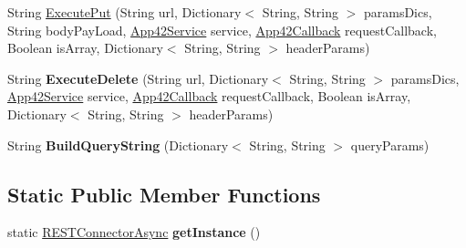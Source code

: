 \begin{DoxyCompactItemize}
\item 
String \hyperlink{classcom_1_1shephertz_1_1app42_1_1paas_1_1sdk_1_1windows_1_1connection_1_1_r_e_s_t_connector_async_a3ba6b0d5a9414e8f6b067ed7ba6167a6}{Execute\+Put} (String url, Dictionary$<$ String, String $>$ params\+Dics, String body\+Pay\+Load, \hyperlink{classcom_1_1shephertz_1_1app42_1_1paas_1_1sdk_1_1windows_1_1_app42_service}{App42\+Service} service, \hyperlink{interfacecom_1_1shephertz_1_1app42_1_1paas_1_1sdk_1_1windows_1_1_app42_callback}{App42\+Callback} request\+Callback, Boolean is\+Array, Dictionary$<$ String, String $>$ header\+Params)
\item 
\hypertarget{classcom_1_1shephertz_1_1app42_1_1paas_1_1sdk_1_1windows_1_1connection_1_1_r_e_s_t_connector_async_a3ae63deb1150d2cb6418f473a7f0e426}{String {\bfseries Execute\+Delete} (String url, Dictionary$<$ String, String $>$ params\+Dics, \hyperlink{classcom_1_1shephertz_1_1app42_1_1paas_1_1sdk_1_1windows_1_1_app42_service}{App42\+Service} service, \hyperlink{interfacecom_1_1shephertz_1_1app42_1_1paas_1_1sdk_1_1windows_1_1_app42_callback}{App42\+Callback} request\+Callback, Boolean is\+Array, Dictionary$<$ String, String $>$ header\+Params)}\label{classcom_1_1shephertz_1_1app42_1_1paas_1_1sdk_1_1windows_1_1connection_1_1_r_e_s_t_connector_async_a3ae63deb1150d2cb6418f473a7f0e426}

\item 
\hypertarget{classcom_1_1shephertz_1_1app42_1_1paas_1_1sdk_1_1windows_1_1connection_1_1_r_e_s_t_connector_async_a69d57706c8838a99beb623c4eb4c49a7}{String {\bfseries Build\+Query\+String} (Dictionary$<$ String, String $>$ query\+Params)}\label{classcom_1_1shephertz_1_1app42_1_1paas_1_1sdk_1_1windows_1_1connection_1_1_r_e_s_t_connector_async_a69d57706c8838a99beb623c4eb4c49a7}

\end{DoxyCompactItemize}
\subsection*{Static Public Member Functions}
\begin{DoxyCompactItemize}
\item 
\hypertarget{classcom_1_1shephertz_1_1app42_1_1paas_1_1sdk_1_1windows_1_1connection_1_1_r_e_s_t_connector_async_a99b7a82fad6d287fb3bcfcc45e97d05e}{static \hyperlink{classcom_1_1shephertz_1_1app42_1_1paas_1_1sdk_1_1windows_1_1connection_1_1_r_e_s_t_connector_async}{R\+E\+S\+T\+Connector\+Async} {\bfseries get\+Instance} ()}\label{classcom_1_1shephertz_1_1app42_1_1paas_1_1sdk_1_1windows_1_1connection_1_1_r_e_s_t_connector_async_a99b7a82fad6d287fb3bcfcc45e97d05e}

\end{DoxyCompactItemize}


